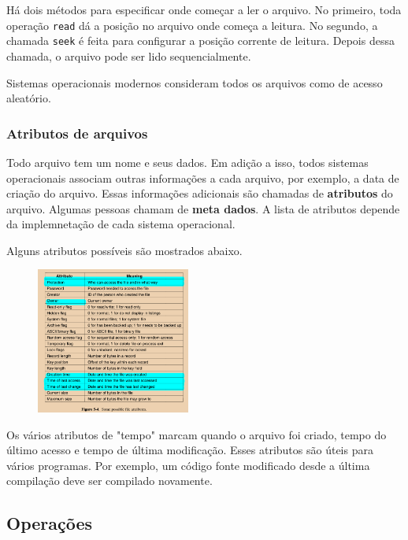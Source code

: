 \documentclass{article}
\begin{document}
Há dois métodos para especificar onde começar a ler o arquivo. No primeiro, toda operação \verb|read| dá a posição no arquivo onde começa a leitura. No segundo, a chamada \verb|seek| é feita para configurar a posição corrente de leitura. Depois dessa chamada, o arquivo pode ser lido sequencialmente. 

Sistemas operacionais modernos consideram todos os arquivos como de acesso aleatório.

\subsubsection{Atributos de arquivos}

Todo arquivo tem um nome e seus dados. Em adição a isso, todos sistemas operacionais associam outras informações a cada arquivo, por exemplo, a data de criação do arquivo. Essas informações adicionais são chamadas de \textbf{atributos} do arquivo. Algumas pessoas chamam de \textbf{meta dados}. A lista de atributos depende da implemnetação de cada sistema operacional.

Alguns atributos possíveis são mostrados abaixo.

\begin{figure}[h]
  \begin{center}
    \includegraphics[width=0.45\textwidth]{img/5-4.png}
  \end{center}
  \caption{}
  \label{fig:}
\end{figure}

Os vários atributos de "tempo" marcam quando o arquivo foi criado, tempo do último acesso e tempo de última modificação. Esses atributos são úteis para vários programas. Por exemplo, um código fonte modificado desde a última compilação deve ser compilado novamente.

\subsection{Operações}
\end{document}
